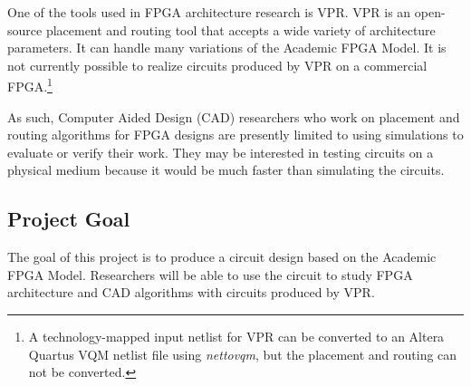 One of the tools used in FPGA architecture research is VPR\cite{vpr}.
VPR is an open-source placement and routing tool that accepts a wide variety of architecture parameters.
It can handle many variations of the Academic FPGA Model.
It is not currently possible to realize circuits produced by VPR on a commercial FPGA.\footnote{A technology-mapped input netlist for VPR can be converted to an Altera Quartus VQM netlist file using \emph{nettovqm}\cite{nettovqm}, but the placement and routing can not be converted.}

As such, Computer Aided Design (CAD) researchers who work on placement and routing algorithms for FPGA designs are presently limited to using simulations to evaluate or verify their work.
They may be interested in testing circuits on a physical medium because it would be much faster than simulating the circuits.



\subsection{Project Goal}

% 

The goal of this project is to produce a circuit design based on the Academic FPGA Model.
Researchers will be able to use the circuit to study FPGA architecture and CAD algorithms with circuits produced by VPR.



